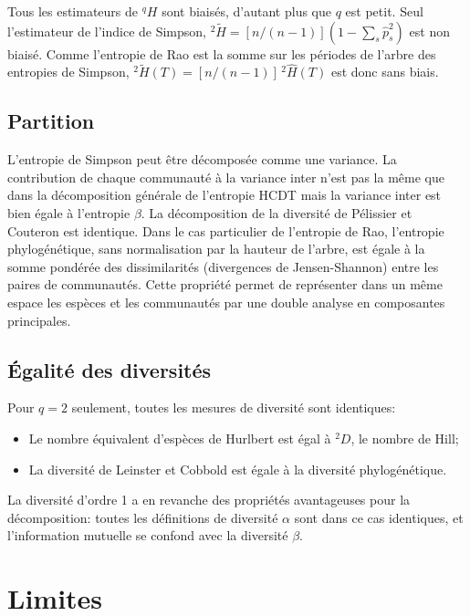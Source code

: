 \documentclass[
  11pt,
  french,
  a4paper,
  extrafontsizes,onecolumn,openright
  ]{memoir}
\providecommand{\tightlist}{%
  \setlength{\itemsep}{0pt}\setlength{\parskip}{0pt}}
\begin{document}
Tous les estimateurs de \(^q\!H\) sont biaisés, d'autant plus que \(q\) est petit.
Seul l'estimateur de l'indice de Simpson, \(^{2}\!\tilde{H}=[n/(n-1)](1-\sum_s{{\hat{p}}^{2}_{s}})\) est non biaisé.
Comme l'entropie de Rao est la somme sur les périodes de l'arbre des entropies de Simpson, \(^{2}\!\tilde{H}(T)=[n/(n-1)]\,^{2}\!\hat{H}(T)\) est donc sans biais.

\hypertarget{partition}{%
\subsection{Partition}\label{partition}}

L'entropie de Simpson peut être décomposée comme une variance.
La contribution de chaque communauté à la variance inter n'est pas la même que dans la décomposition générale de l'entropie HCDT mais la variance inter est bien égale à l'entropie \(\beta\).
La décomposition de la diversité de Pélissier et Couteron est identique.
Dans le cas particulier de l'entropie de Rao, l'entropie phylogénétique, sans normalisation par la hauteur de l'arbre, est égale à la somme pondérée des dissimilarités (divergences de Jensen-Shannon) entre les paires de communautés.
Cette propriété permet de représenter dans un même espace les espèces et les communautés par une double analyse en composantes principales.

\hypertarget{uxe9galituxe9-des-diversituxe9s}{%
\subsection{Égalité des diversités}\label{uxe9galituxe9-des-diversituxe9s}}

Pour \(q=2\) seulement, toutes les mesures de diversité sont identiques:

\begin{itemize}
\tightlist
\item
  Le nombre équivalent d'espèces de Hurlbert est égal à \(^{2}\!D\), le nombre de Hill;
\item
  La diversité de Leinster et Cobbold est égale à la diversité phylogénétique.
\end{itemize}

La diversité d'ordre 1 a en revanche des propriétés avantageuses pour la décomposition: toutes les définitions de diversité \(\alpha\) sont dans ce cas identiques, et l'information mutuelle se confond avec la diversité \(\beta\).

\hypertarget{limites}{%
\section{Limites}\label{limites}}
\end{document}
